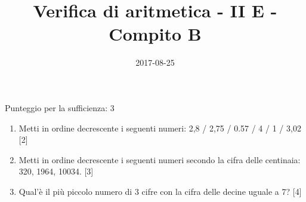 \documentclass[11pt,fleqn]{article} %
\title{Verifica di aritmetica - II E - Compito B}
\date{2017-08-25}
\begin{document}
\maketitle
Punteggio per la sufficienza: 3
\begin{enumerate}

	\item Metti in ordine decrescente i seguenti numeri: 2,8 / 2,75 / 0.57 / 4 / 1 / 3,02 [2] 
\item Metti in ordine decrescente i seguenti numeri secondo la cifra delle centinaia: 320, 1964, 10034.  [3] 
\item Qual'è il più piccolo numero di 3 cifre con la cifra delle decine uguale a 7? [4] 
\end{enumerate}
\end{document}
